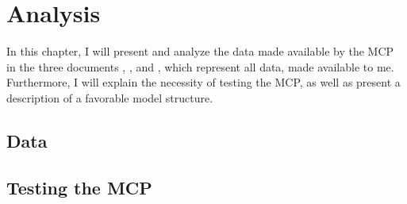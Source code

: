 \chapter{Analysis}


In this chapter, I will present and analyze the data made available by the MCP in the three documents , , and , which represent all data, made available to me. Furthermore, I will explain the necessity of testing the MCP, as well as present a description of a favorable model structure. 

\section{Data} %


\section{Testing the MCP} %

